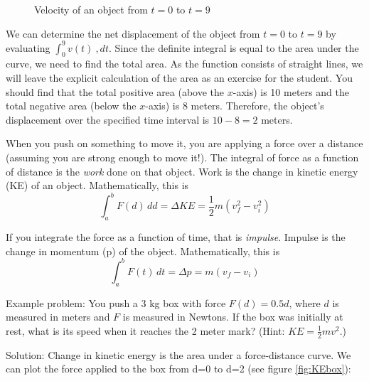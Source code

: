 \begin{figure}[htbp]
	\caption{Velocity of an object from $t=0$ to $t=9$}
	\label{fig:velocity}
\end{figure}

We can determine the net displacement of the object from $t = 0$ to 
$t = 9$ by evaluating $\int_{0}^{9} v(t) \ , dt$. Since the definite 
integral is equal to the area under the curve, we need to find the 
total area. As the function consists of straight lines, we will leave 
the explicit calculation of the area as an exercise for the student. 
You should find that the total positive area (above the $x$-axis) is 
10 meters and the total negative area (below the $x$-axis) is 8 meters. 
Therefore, the object's displacement over the specified time interval 
is $10 - 8 = 2$ meters. 

When you push on something to move it, you are applying a force over 
a distance (assuming you are strong enough to move it!). The integral 
of force as a function of distance is the \textit{work} done on that 
object.  Work is the change in kinetic energy (KE) of an object. 
Mathematically, this is $$\int_{a}^{b} F(d)\,dd = \Delta KE = 
\frac{1}{2} m (v_f^2 - v_i^2)$$

If you integrate the force as a function of time, that is 
\textit{impulse}. Impulse is the change in momentum (p) of the 
object. Mathematically, this is $$\int_{a}^{b} F(t)\,dt = \Delta p 
= m (v_f - v_i)$$

Example problem: You push a 3 kg box with force $F(d) = 0.5d$, where 
$d$ is measured in meters and $F$ is measured in Newtons. If the box 
was initially at rest, what is its speed when it reaches the 2 meter 
mark? (Hint: $KE = \frac{1}{2} m v^2$.) 

Solution: Change in kinetic energy is the area under a force-distance 
curve. We can plot the force applied to the box from d=0 to d=2 (see 
figure \ref{fig:KEbox}):

